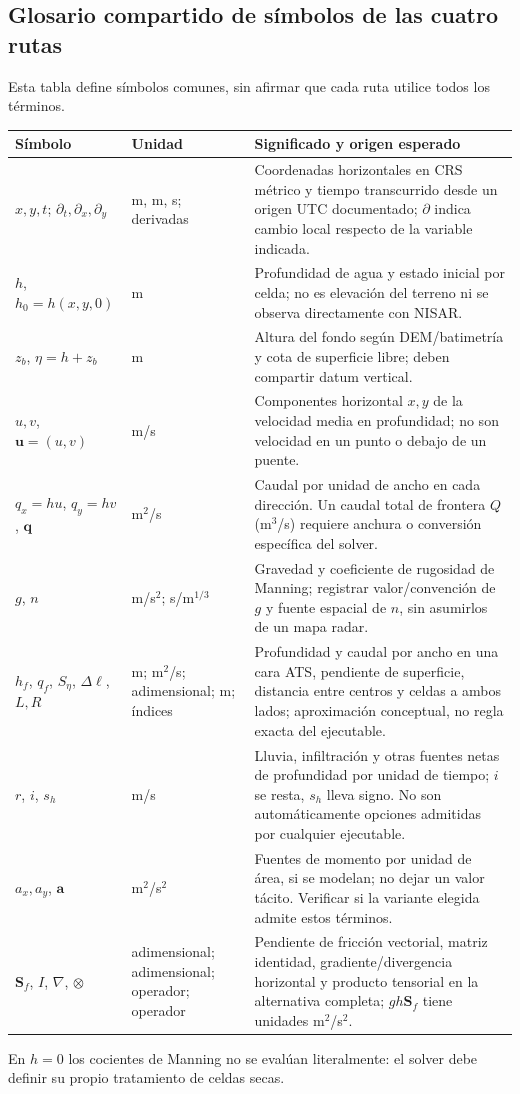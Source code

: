 \documentclass[11pt,a4paper]{article}
\begin{document}
\subsection{Glosario compartido de símbolos de las cuatro rutas}
Esta tabla define símbolos comunes, sin afirmar que cada ruta utilice todos los términos.
\begin{longtable}{p{}p{}p{}}
\toprule Símbolo & Unidad & Significado y origen esperado\\\midrule
$x,y,t$; $\partial_t,\partial_x,\partial_y$ & m, m, s; derivadas & Coordenadas horizontales en CRS métrico y tiempo transcurrido desde un origen UTC documentado; $\partial$ indica cambio local respecto de la variable indicada.\\
$h$, $h_0=h(x,y,0)$ & m & Profundidad de agua y estado inicial por celda; no es elevación del terreno ni se observa directamente con NISAR.\\
$z_b$, $\eta=h+z_b$ & m & Altura del fondo según DEM/batimetría y cota de superficie libre; deben compartir datum vertical.\\
$u,v$, $\boldsymbol u=(u,v)$ & m/s & Componentes horizontal $x,y$ de la velocidad media en profundidad; no son velocidad en un punto o debajo de un puente.\\
$q_x=hu$, $q_y=hv$, $\boldsymbol q$ & m$^2$/s & Caudal por unidad de ancho en cada dirección. Un caudal total de frontera $Q$ (m$^3$/s) requiere anchura o conversión específica del solver.\\
$g$, $n$ & m/s$^2$; s/m$^{1/3}$ & Gravedad y coeficiente de rugosidad de Manning; registrar valor/convención de $g$ y fuente espacial de $n$, sin asumirlos de un mapa radar.\\
$h_f$, $q_f$, $S_\eta$, $\Delta\ell$, $L,R$ & m; m$^2$/s; adimensional; m; índices & Profundidad y caudal por ancho en una cara ATS, pendiente de superficie, distancia entre centros y celdas a ambos lados; aproximación conceptual, no regla exacta del ejecutable.\\
$r$, $i$, $s_h$ & m/s & Lluvia, infiltración y otras fuentes netas de profundidad por unidad de tiempo; $i$ se resta, $s_h$ lleva signo. No son automáticamente opciones admitidas por cualquier ejecutable.\\
$a_x,a_y$, $\boldsymbol a$ & m$^2$/s$^2$ & Fuentes de momento por unidad de área, si se modelan; no dejar un valor tácito. Verificar si la variante elegida admite estos términos.\\
$\boldsymbol S_f$, $I$, $\nabla$, $\otimes$ & adimensional; adimensional; operador; operador & Pendiente de fricción vectorial, matriz identidad, gradiente/divergencia horizontal y producto tensorial en la alternativa completa; $gh\boldsymbol S_f$ tiene unidades m$^2$/s$^2$.\\
\bottomrule
\end{longtable}
En $h=0$ los cocientes de Manning no se evalúan literalmente: el solver debe definir su propio tratamiento de celdas secas.
\end{document}
